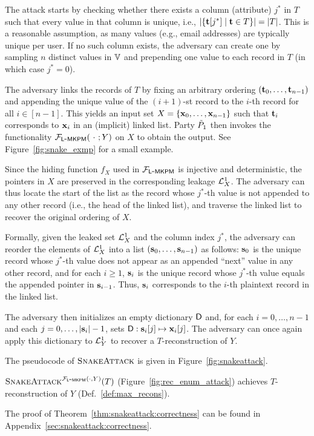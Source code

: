 The attack starts by checking whether there exists a column (attribute) $j^*$ in
$T$ such that every value in that column is unique, i.e.,
$|\{\mathbf{t}[j^*] \; | \; \mathbf{t} \in T\}| = |T|$. This is a reasonable assumption, as
many values (e.g., email addresses) are typically unique per user. If no such
column exists, the adversary can create one by sampling $n$ distinct values in
$\Ispace[]$ and prepending one value to each record in $T$ (in which case
$j^* = 0$).


The adversary links the records of $T$ by fixing an arbitrary ordering
$(\mathbf{t}_0, \dots, \mathbf{t}_{n-1})$ and appending the unique value of the $(i+1)$-st
record to the $i$-th record for all $i \in [n-1]$. This yields an
input set $X = \{\mathbf{x}_0, \dots, \mathbf{x}_{n-1}\}$ such that $\mathbf{t}_i$ corresponds to
$\mathbf{x}_i$ in an (implicit) linked list. Party $\tilde{P}_1$ then invokes the
functionality $\calF_{\LMKPM}(\ \cdot\ ;Y)$ on $X$ to obtain the output. See
Figure~\ref{fig:snake_exmp} for a small example.

Since the hiding function $f_X$ used in $\mathcal{F}_{\mathsf{L\mbox{-}MKPM}}$ is injective and
deterministic, the pointers in $X$ are preserved in the corresponding leakage
$\mathcal{L}^{1}_X$. The adversary can thus locate the start of the list as the record
whose $j^*$-th value is not appended to any other record (i.e., the head of the
linked list), and traverse the linked list to recover the original ordering of
$X$.

Formally, given the leaked set $\mathcal{L}^{1}_X$ and the column index $j^*$, the
adversary can reorder the elements of $\mathcal{L}^{1}_X$ into a list
$(\mathbf{s}_0, \dots, \mathbf{s}_{n-1})$ as follows: $\mathbf{s}_0$ is the unique record whose
$j^*$-th value does not appear as an appended ``next'' value in any other
record, and for each $i \geq 1$, $\mathbf{s}_i$ is the unique record whose $j^*$-th
value equals the appended pointer in $\mathbf{s}_{i-1}$. Thus, $\mathbf{s}_i$ corresponds to
the $i$-th plaintext record in the linked list.


The adversary then initializes an empty dictionary $\mathsf{D}$ and, for each
$i = 0,\dots,n-1$ and each $j = 0,\dots,|\mathbf{s}_i|-1$, sets
$\mathsf{D} : \mathbf{s}_i[j] \mapsto \mathbf{x}_i[j]$. The adversary can once again apply this
dictionary to $\mathcal{L}^{1}_Y$ to recover a $T$-reconstruction of $Y$.

The pseudocode of $\textsc{SnakeAttack}$ is given in Figure~\ref{fig:snakeattack}.

\begin{theorem}\label{thm:snakeattack:correctness}
  $\textsc{SnakeAttack}^{\mathcal{F}_{\mathsf{L\mbox{-}MKPM}}(\cdot, Y)}(T)$ (Figure~\ref{fig:rec_enum_attack})
  achieves $T$-reconstruction of $Y$ (Def.~\ref{def:max_recons}).
\end{theorem}
The proof of Theorem~\ref{thm:snakeattack:correctness} can be found in
Appendix~\ref{sec:snakeattack:correctness}.

